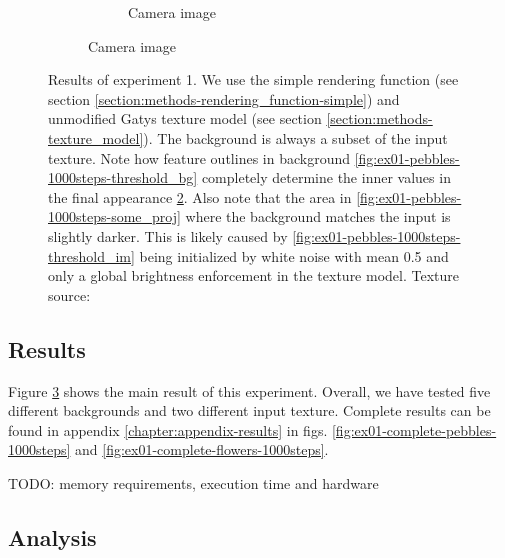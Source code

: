 \begin{figure}[]
\begin{subfigure}{\textwidth}
\begin{subfigure}{0.24\textwidth}
            \caption{Camera image}
            \label{fig:ex01-pebbles-1000steps-threshold_proj}
        \end{subfigure}
    \end{subfigure}
    \caption{Results of experiment 1. We use the simple rendering function (see section \ref{section:methods-rendering_function-simple}) and unmodified Gatys texture model (see section \ref{section:methods-texture_model}). The background is always a subset of the input texture. Note how feature outlines in background \ref{fig:ex01-pebbles-1000steps-threshold_bg} completely determine the inner values in the final appearance \ref{fig:ex01-pebbles-1000steps-threshold_proj}. Also note that the area in \ref{fig:ex01-pebbles-1000steps-some_proj} where the background matches the input is slightly darker. This is likely caused by \ref{fig:ex01-pebbles-1000steps-threshold_im} being initialized by white noise with mean 0.5 and only a global brightness enforcement in the texture model. Texture source: \citet{Gatys2015}}
    \label{fig:ex01-pebbles-1000steps}
\end{figure}

\subsection{Results}
\label{section:results-experiments-01-results}

Figure \ref{fig:ex01-pebbles-1000steps} shows the main result of this experiment. Overall, we have tested five different backgrounds and two different input texture. Complete results can be found in appendix \ref{chapter:appendix-results} in figs. \ref{fig:ex01-complete-pebbles-1000steps} and \ref{fig:ex01-complete-flowers-1000steps}.

{\color{red} TODO: memory requirements, execution time and hardware}

\subsection{Analysis}
\label{section:results-experiments-01-analysis}

